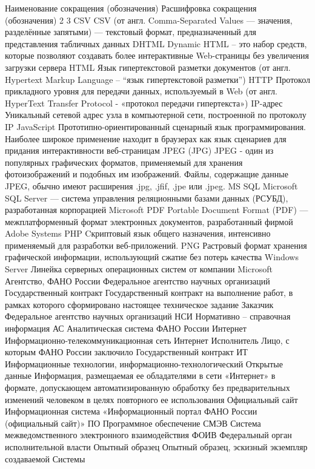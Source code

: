 Наименование сокращения (обозначения)
Расшифровка сокращения (обозначения)
2
3
CSV
CSV (от англ. Comma-Separated Values — значения, разделённые запятыми) — текстовый формат, предназначенный для представления табличных данных
DHTML
Dynamic HTML – это набор средств, которые позволяют создавать более интерактивные Web-страницы без увеличения загрузки сервера
HTML
Язык гипертекстовой разметки документов (от англ. Hypertext Markup Language – “язык гипертекстовой разметки”)
HTTP
Протокол прикладного уровня для передачи данных, используемый в Web (от англ. HyperText Transfer Protocol - «протокол передачи гипертекста») 
IP-адрес
Уникальный сетевой адрес узла в компьютерной сети, построенной по протоколу IP
JavaScript
Прототипно-ориентированный сценарный язык программирования. Наиболее широкое применение находит в браузерах как язык сценариев для придания интерактивности веб-страницам
JPEG (JPG)
JPEG - один из популярных графических форматов, применяемый для хранения фотоизображений и подобных им изображений. Файлы, содержащие данные JPEG, обычно имеют расширения .jpg, .jfif, .jpe или .jpeg.
MS SQL
Microsoft SQL Server — система управления реляционными базами данных (РСУБД), разработанная корпорацией Microsoft
PDF
Portable Document Format (PDF) — межплатформенный формат электронных документов, разработанный фирмой Adobe Systems
PHP
Cкриптовый язык общего назначения, интенсивно применяемый для разработки веб-приложений.
PNG
Растровый формат хранения графической информации, использующий сжатие без потерь качества
Windows Server 
Линейка серверных операционных систем от компании Microsoft
Агентство, ФАНО России
Федеральное агентство научных организаций 
Государственный контракт
Государственный контракт на выполнение работ, в рамках которого сформировано настоящее техническое задание
Заказчик
Федеральное агентство научных организаций 
НСИ
Нормативно – справочная информация
АС 
Аналитическая система ФАНО России
Интернет
Информационно-телекоммуникационная сеть Интернет
Исполнитель
Лицо, с которым ФАНО России заключило Государственный контракт
ИТ
Информационные технологии, информационно-технологический
Открытые данные
Информация, размещаемая ее обладателями в сети «Интернет» в формате, допускающем автоматизированную обработку без предварительных изменений человеком в целях повторного ее использования
Официальный сайт
Информационная система «Информационный портал ФАНО России (официальный сайт)»
ПО 
Программное обеспечение
СМЭВ
Система межведомственного электронного взаимодействия
ФОИВ
Федеральный орган исполнительной власти
Опытный образец
Опытный образец, эскизный экземпляр создаваемой Системы




